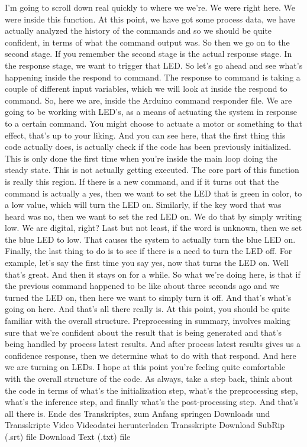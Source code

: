     I'm going to scroll down real quickly to where we we're.
    We were right here.
    We were inside this function.
    At this point, we have got some process data,
    we have actually analyzed the history of the commands
    and so we should be quite confident, in terms of what the command output was.
    So then we go on to the second stage.
    If you remember the second stage is the actual response stage.
    In the response stage, we want to trigger that LED.
    So let's go ahead and see what's happening inside the respond
    to command.
    The response to command is taking a couple
    of different input variables, which we will
    look at inside the respond to command.
    So, here we are, inside the Arduino command responder file.
    We are going to be working with LED's, as a means of actuating the system
    in response to a certain command.
    You might choose to actuate a motor or something to that effect, that's
    up to your liking.
    And you can see here, that the first thing this code actually does,
    is actually check if the code has been previously initialized.
    This is only done the first time when you're inside
    the main loop doing the steady state.
    This is not actually getting executed.
    The core part of this function is really this region.
    If there is a new command, and if it turns out that the command is actually
    a yes, then we want to set the LED that is green in color,
    to a low value, which will turn the LED on.
    Similarly, if the key word that was heard was no, then
    we want to set the red LED on.
    We do that by simply writing low.
    We are digital, right?
    Last but not least, if the word is unknown,
    then we set the blue LED to low.
    That causes the system to actually turn the blue LED on.
    Finally, the last thing to do is to see if there is a need to turn the LED off.
    For example, let's say the first time you say yes, now that turns the LED on.
    Well that's great.
    And then it stays on for a while.
    So what we're doing here, is that if the previous command happened
    to be like about three seconds ago and we turned the LED on, then
    here we want to simply turn it off.
    And that's what's going on here.
    And that's all there really is.
    At this point, you should be quite familiar with the overall structure.
    Preprocessing in summary, involves making sure
    that we're confident about the result that is being generated
    and that's being handled by process latest results.
    And after process latest results gives us a confidence response,
    then we determine what to do with that respond.
    And here we are turning on LEDs.
    I hope at this point you're feeling quite
    comfortable with the overall structure of the code.
    As always, take a step back, think about the code
    in terms of what's the initialization step, what's the preprocessing
    step, what's the inference step, and finally
    what's the post-processing step.
    And that's all there is.
    Ende des Transkriptes, zum Anfang springen
    Downloads und Transskripte
    Video
    Videodatei herunterladen
    Transskripte
    Download SubRip (.srt) file
    Download Text (.txt) file    
    
